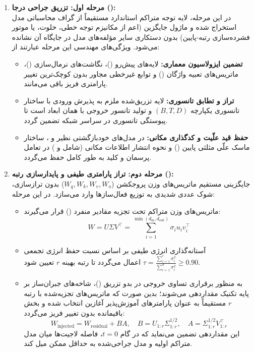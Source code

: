 \documentclass[12pt,a4paper]{report}
\theoremstyle{definition}
\begin{document}
\begin{enumerate}
    \item \textbf{مرحله اول: تزریق جراحی درجا ():} \\
    در این مرحله، لایه توجه متراکم استاندارد مستقیماً از گراف محاسباتی مدل استخراج شده و ماژول جایگزین (اعم از مکانیزم توجه خطی، خلوت، یا موتور فشرده‌سازی رتبه-پایین) بدون دستکاری سایر مؤلفه‌های مدل در جایگاه آن نشانده می‌شود. ویژگی‌های مهندسی این مرحله عبارتند از:
    \begin{itemize}
        \item \textbf{تضمین ایزولاسیون معماری:} لایه‌های پیش‌رو ()، نگاشت‌های نرمال‌سازی ()، ماتریس‌های تعبیه واژگان () و توابع غیرخطی مجاور بدون کوچک‌ترین تغییر پارامتری فریز باقی می‌مانند.
        \item \textbf{تراز و تطابق تانسوری:} لایه تزریق‌شده ملزم به پذیرش ورودی با ساختار تانسوری یکپارچه $(B, T, D)$ و تولید تانسور خروجی با همان ابعاد است تا پیوستگی تانسوری در سراسر شبکه تضمین گردد.
        \item \textbf{حفظ قید علّیت و کدگذاری مکانی:} در مدل‌های خودبازگشتی نظیر  و ، ساختار ماسک علّی مثلثی پایین () و نحوه انتشار اطلاعات مکانی (شامل  و ) در تعامل پرسمان و کلید به طور کامل حفظ می‌گردد.
    \end{itemize}

    \item \textbf{مرحله دوم: تراز پارامتری طیفی و پایدارسازی رتبه ():} \\
    جایگزینی مستقیم ماتریس‌های وزن پروجکشن ($W_q, W_k, W_v, W_o$) بدون ترازسازی، شوک عددی شدیدی به توزیع فعال‌سازها وارد می‌سازد. در این مرحله:
    \begin{itemize}
        \item ماتریس‌های وزن متراکم تحت تجزیه مقادیر منفرد () قرار می‌گیرند:
        \begin{equation}
            W = U \Sigma V^\top = \sum_{i=1}^{\min(d_{\text{in}}, d_{\text{out}})} \sigma_i u_i v_i^\top
        \end{equation}
        \item آستانه‌گذاری انرژی طیفی بر اساس نسبت حفظ انرژی تجمعی $\tau = \frac{\sum_{i=1}^r \sigma_i^2}{\sum_{i=1}^d \sigma_i^2} \ge 0.90$ اعمال می‌گردد تا رتبه بهینه $r$ تعیین شود.
        \item به منظور برقراری تساوی خروجی در بدو تزریق ()، شاخه‌های جبران‌ساز بر پایه تکنیک  \cite{meng2024pissa} مقداردهی می‌شوند؛ بدین صورت که ماتریس‌های تجزیه‌شده با رتبه $r$ مستقیماً به عنوان پارامترهای آموزش‌پذیر آغازین انتخاب شده و بخش باقیمانده بدون تغییر فریز می‌گردد:
        \begin{equation}
            W_{\text{injected}} = W_{\text{residual}} + B A, \quad B = U_{1:r} \Sigma_{1:r}^{1/2}, \quad A = \Sigma_{1:r}^{1/2} V_{1:r}^\top
        \end{equation}
        این مقداردهی تضمین می‌نماید که در گام $t=0$، فاصله لاجیت‌ها میان مدل متراکم اولیه و مدل جراحی‌شده به حداقل ممکن میل کند.
    \end{itemize}


\end{enumerate}
\end{document}
